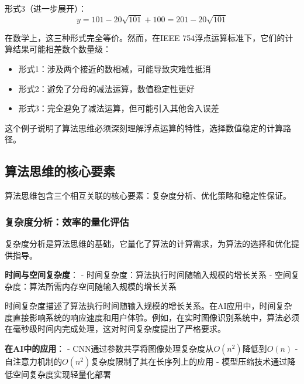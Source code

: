 形式3（进一步展开）：
$$y = 101 - 20\sqrt{101} + 100 = 201 - 20\sqrt{101}$$

在数学上，这三种形式完全等价。然而，在IEEE 754浮点运算标准下，它们的计算结果可能相差数个数量级：

\begin{itemize}
\item 形式1：涉及两个接近的数相减，可能导致灾难性抵消
\item 形式2：避免了分母的减法运算，数值稳定性更好
\item 形式3：完全避免了减法运算，但可能引入其他舍入误差
\end{itemize}

这个例子说明了算法思维必须深刻理解浮点运算的特性，选择数值稳定的计算路径。

\subsection{算法思维的核心要素}

算法思维包含三个相互关联的核心要素：复杂度分析、优化策略和稳定性保证。

\subsubsection{复杂度分析：效率的量化评估}

复杂度分析是算法思维的基础，它量化了算法的计算需求，为算法的选择和优化提供指导。
  
\textbf{时间与空间复杂度}：
- 时间复杂度：算法执行时间随输入规模的增长关系
- 空间复杂度：算法所需内存空间随输入规模的增长关系
  
时间复杂度描述了算法执行时间随输入规模的增长关系。在AI应用中，时间复杂度直接影响系统的响应速度和用户体验。例如，在实时图像识别系统中，算法必须在毫秒级时间内完成处理，这对时间复杂度提出了严格要求。

  \textbf{在AI中的应用}：
  - CNN通过参数共享将图像处理复杂度从$O(n^2)$降低到$O(n)$
  - 自注意力机制的$O(n^2)$复杂度限制了其在长序列上的应用
  - 模型压缩技术通过降低空间复杂度实现轻量化部署
  
